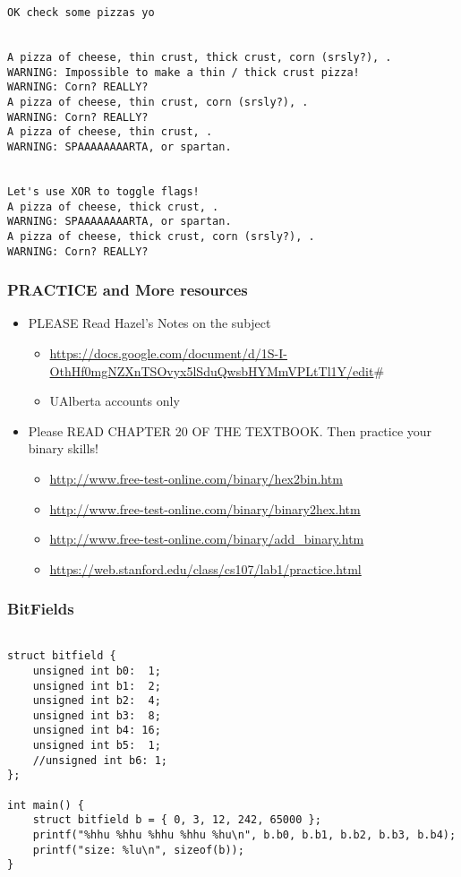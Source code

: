 \documentclass[11pt]{article}
\begin{document}
\begin{enumerate}
\begin{verbatim}
OK check some pizzas yo


A pizza of cheese, thin crust, thick crust, corn (srsly?), .
WARNING: Impossible to make a thin / thick crust pizza!
WARNING: Corn? REALLY?
A pizza of cheese, thin crust, corn (srsly?), .
WARNING: Corn? REALLY?
A pizza of cheese, thin crust, .
WARNING: SPAAAAAAAARTA, or spartan.


Let's use XOR to toggle flags!
A pizza of cheese, thick crust, .
WARNING: SPAAAAAAAARTA, or spartan.
A pizza of cheese, thick crust, corn (srsly?), .
WARNING: Corn? REALLY?
\end{verbatim}
\end{enumerate}

\subsubsection{PRACTICE and More resources}
\label{sec:org51a982b}

\begin{itemize}
\item PLEASE Read Hazel's Notes on the subject 
\begin{itemize}
\item \url{https://docs.google.com/document/d/1S-I-OthHf0mgNZXnTSOvyx5lSduQwsbHYMmVPLtTl1Y/edit}\#
\item UAlberta accounts only
\end{itemize}

\item Please READ CHAPTER 20 OF THE TEXTBOOK. Then practice your binary skills!
\begin{itemize}
\item \url{http://www.free-test-online.com/binary/hex2bin.htm}
\item \url{http://www.free-test-online.com/binary/binary2hex.htm}
\item \url{http://www.free-test-online.com/binary/add\_binary.htm}
\item \url{https://web.stanford.edu/class/cs107/lab1/practice.html}
\end{itemize}
\end{itemize}


\subsubsection{BitFields}
\label{sec:org7a99ab9}

\begin{verbatim}

struct bitfield {
    unsigned int b0:  1;
    unsigned int b1:  2;
    unsigned int b2:  4;
    unsigned int b3:  8;
    unsigned int b4: 16;
    unsigned int b5:  1;
    //unsigned int b6: 1;
};

int main() {
    struct bitfield b = { 0, 3, 12, 242, 65000 };
    printf("%hhu %hhu %hhu %hhu %hu\n", b.b0, b.b1, b.b2, b.b3, b.b4);
    printf("size: %lu\n", sizeof(b));
}

\end{verbatim}
\end{document}
